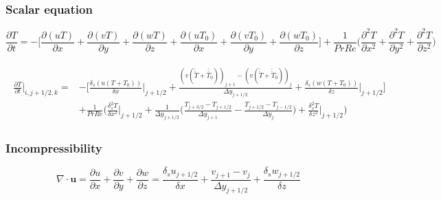 \documentclass[preprint,12pt]{article}
\begin{document}
\subsubsection{Scalar equation}

\begin{equation}
\frac{\partial T}{\partial t}=-\Bigg[\frac{\partial (uT)}{\partial x}+\frac{\partial (vT)}{\partial y}+\frac{\partial (wT)}{\partial z}+\frac{\partial (u{T_0})}{\partial x}+\frac{\partial (v{T_0})}{\partial y}+\frac{\partial (w{T_0})}{\partial z}\Bigg]+\frac{1}{Pr Re} \Big(\frac{\partial^2 T}{\partial x^2}+\frac{\partial^2 T}{\partial y^2}+\frac{\partial^2 T}{\partial z^2}\Big)
\end{equation}

\begin{align}	\begin{split}
\frac{\partial T}{\partial t}\Big|_{i,j+1/2,k}=&-\Bigg[\frac{ \delta_s(u(T+T_0))}{\delta x}\Big|_{j+1/2}+\frac{(v(\check{\check{T}}+\check{\check{T_0}}))_{j+1}-(v(\check{\check{T}}+\check{\check{T}}_0))_{j}}{\Delta y_{j+1/2}}+\frac{ \delta_s(w(T+T_0))}{\delta z}\Big|_{j+1/2} \Bigg]\\&+\frac{1}{PrRe}\Bigg(\frac{\delta_s^2T}{\delta x^2}\Bigg|_{j+1/2}+\frac{1}{\Delta y_{j+1/2}}\Big(\frac{T_{j+3/2}-T_{j+1/2}}{\Delta y_{j+1}}-\frac{T_{j+1/2}-T_{j-1/2}}{\Delta y_{j}}\Big) +\frac{\delta_s^2T}{\delta z^2}\Bigg|_{j+1/2}\Bigg)
\end{split}	\end{align} 
\subsubsection{Incompressibility}
\begin{equation}
\nabla\cdot \mathbf{u}=\frac{\partial u}{\partial x}+\frac{\partial v}{\partial y}+\frac{\partial w}{\partial z}=\frac{\delta_s u_{j+1/2}}{\delta x}+\frac{v_{j+1}-v_j}{\Delta y_{j+1/2}}+\frac{\delta_s w_{j+1/2}}{\delta z}
\end{equation}
\end{document}
